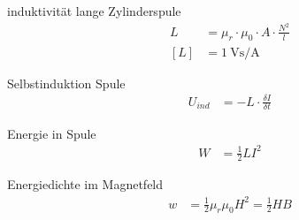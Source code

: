 \begin{karte}{induktivität lange Zylinderspule}
    \begin{align*}
        L &= \mu_r \cdot \mu_0 \cdot A \cdot \frac{N^2}{l} \\
        [L] &= \SI{1}{\volt\second\per\ampere}
    \end{align*}
\end{karte}

\begin{karte}{Selbstinduktion Spule}
    \begin{align*}
        U_{ind} &= -L \cdot \frac{\delta I}{\delta t}
    \end{align*}
\end{karte}

\begin{karte}{Energie in Spule}
    \begin{align*}
        W &= \frac{1}{2} L I^2
    \end{align*}
\end{karte}

\begin{karte}{Energiedichte im Magnetfeld}
    \begin{align*}
        w &= \frac{1}{2} \mu_r \mu_0 H^2 = \frac{1}{2} H B
    \end{align*}
\end{karte}
